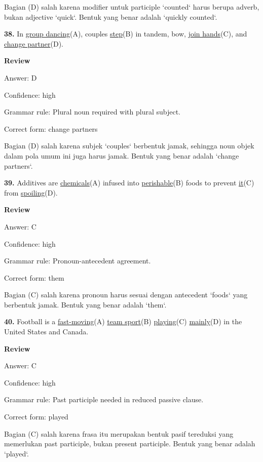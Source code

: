 \documentclass[12pt]{article}
\begin{document}
Bagian (D) salah karena modifier untuk participle `counted` harus berupa adverb, bukan adjective `quick`. Bentuk yang benar adalah `quickly counted`.\par
\endgroup
\par
\vspace{\questionblockgap}
\noindent\textbf{38.} In \uline{group dancing}(A), couples \uline{step}(B) in tandem, bow, \uline{join hands}(C), and \uline{change partner}(D).
\par
\begingroup
\setlength{\parskip}{0pt}
\setlength{\parindent}{0pt}
\textbf{Review}\par
Answer: D\par
Confidence: high\par
Grammar rule: Plural noun required with plural subject.\par
Correct form: change partners\par
Bagian (D) salah karena subjek `couples` berbentuk jamak, sehingga noun objek dalam pola umum ini juga harus jamak. Bentuk yang benar adalah `change partners`.\par
\endgroup
\par
\vspace{\questionblockgap}
\noindent\textbf{39.} Additives are \uline{chemicals}(A) infused into \uline{perishable}(B) foods to prevent \uline{it}(C) from \uline{spoiling}(D).
\par
\begingroup
\setlength{\parskip}{0pt}
\setlength{\parindent}{0pt}
\textbf{Review}\par
Answer: C\par
Confidence: high\par
Grammar rule: Pronoun-antecedent agreement.\par
Correct form: them\par
Bagian (C) salah karena pronoun harus sesuai dengan antecedent `foods` yang berbentuk jamak. Bentuk yang benar adalah `them`.\par
\endgroup
\par
\vspace{\questionblockgap}
\noindent\textbf{40.} Football is a \uline{fast-moving}(A) \uline{team sport}(B) \uline{playing}(C) \uline{mainly}(D) in the United States and Canada.
\par
\begingroup
\setlength{\parskip}{0pt}
\setlength{\parindent}{0pt}
\textbf{Review}\par
Answer: C\par
Confidence: high\par
Grammar rule: Past participle needed in reduced passive clause.\par
Correct form: played\par
Bagian (C) salah karena frasa itu merupakan bentuk pasif tereduksi yang memerlukan past participle, bukan present participle. Bentuk yang benar adalah `played`.\par
\endgroup
\par
\vspace{\questionblockgap}
\end{document}
